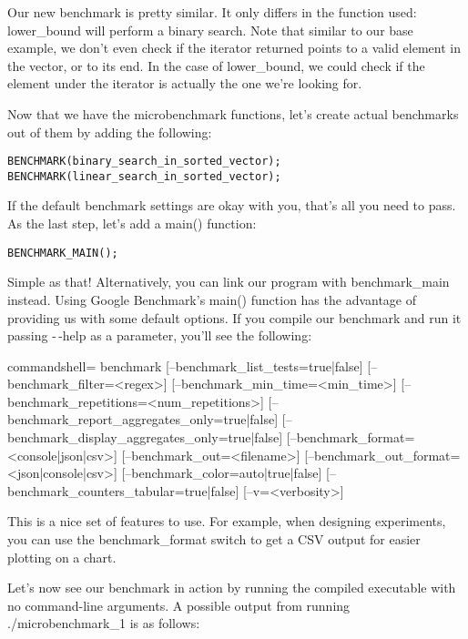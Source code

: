 Our new benchmark is pretty similar. It only differs in the function used: lower\_bound will perform a binary search. Note that similar to our base example, we don't even check if the iterator returned points to a valid element in the vector, or to its end. In the case of lower\_bound, we could check if the element under the iterator is actually the one we're looking for.

Now that we have the microbenchmark functions, let's create actual benchmarks out of them by adding the following:

\begin{lstlisting}[style=styleCXX]
BENCHMARK(binary_search_in_sorted_vector);
BENCHMARK(linear_search_in_sorted_vector);
\end{lstlisting}

If the default benchmark settings are okay with you, that's all you need to pass. As the last step, let's add a main() function:

\begin{lstlisting}[style=styleCXX]
BENCHMARK_MAIN();
\end{lstlisting}

Simple as that! Alternatively, you can link our program with benchmark\_main instead. Using Google Benchmark's main() function has the advantage of providing us with some default options. If you compile our benchmark and run it passing -\,-help as a parameter, you'll see the following:

\begin{tcblisting}{commandshell={}}
benchmark [--benchmark_list_tests={true|false}]
          [--benchmark_filter=<regex>]
          [--benchmark_min_time=<min_time>]
          [--benchmark_repetitions=<num_repetitions>]
          [--benchmark_report_aggregates_only={true|false}]
          [--benchmark_display_aggregates_only={true|false}]
          [--benchmark_format=<console|json|csv>]
          [--benchmark_out=<filename>]
          [--benchmark_out_format=<json|console|csv>]
          [--benchmark_color={auto|true|false}]
          [--benchmark_counters_tabular={true|false}]
          [--v=<verbosity>]
\end{tcblisting}

This is a nice set of features to use. For example, when designing experiments, you can use the benchmark\_format switch to get a CSV output for easier plotting on a chart.

Let's now see our benchmark in action by running the compiled executable with no command-line arguments. A possible output from running ./microbenchmark\_1 is as follows:

